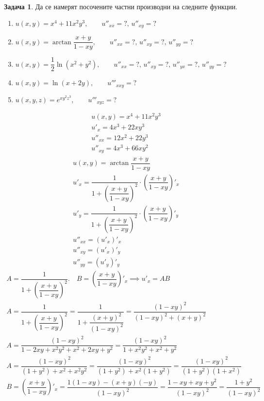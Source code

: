 \documentclass[a4paper,fleqn,12pt]{article}
\theoremstyle{definition}
\newtheorem{task}{Задача}[subsection]
\begin{document}
\begin{task}
Да се намерят посочените частни производни на следните функции.\\
\begin{enumerate}
\item $u(x,y) = x^4 + 11x^2y^3, \qquad u''_{xx} = ?,\, u''_{xy} = ?$ 
\item $u(x,y) = \arctan{\dfrac{x+y}{1-xy}}, \qquad u''_{xx} = ?,\, u''_{xy} = ?,\,u''_{yy} = ?$
\item $u(x,y) = \dfrac{1}{2} \ln{(x^2 + y^2)}, \qquad u''_{xx} = ?,\, u''_{xy} = ?,\,u''_{yx} = ?,\,u''_{yy} = ?$
\item $u(x,y) = \ln{(x + 2y)}, \qquad u'''_{xxy} = ?$
\item $u(x,y,z) = e^{xy^2z^3}, \qquad u'''_{xyz} = ?$
\end{enumerate}
\begin{gather*}
u(x,y) = x^4 + 11x^2y^3 \\
u'_x = 4x^3 + 22xy^3 \\
u''_{xx} = 12x^2 + 22y^3 \\
u''_{xy} = 4x^3 + 66xy^2 
\end{gather*}
\begin{gather*}
u(x,y) = \arctan{\dfrac{x+y}{1-xy}}\\
u'_x = \dfrac{1}{1 + \left( \dfrac{x+y}{1-xy} \right)^2} \cdot  \left( \dfrac{x+y}{1-xy} \right)'_x\\
u'_y = \dfrac{1}{1 + \left( \dfrac{x+y}{1-xy} \right)^2} \cdot  \left( \dfrac{x+y}{1-xy} \right)'_y\\
u''_{xx} = (u'_x)'_x\\
u''_{xy} = (u'_x)'_y\\
u''_{yy} = (u'_y)'_y
\end{gather*}
\begin{gather*}
A = \dfrac{1}{1 + \left( \dfrac{x+y}{1-xy} \right)^2}. \quad B = \left( \dfrac{x+y}{1-xy} \right)'_x \implies u'_x = AB\\
A = \dfrac{1}{1 + \left( \dfrac{x+y}{1-xy} \right)^2} =\dfrac{1}{1 + \dfrac{(x+y)^2}{(1-xy)^2}} = \dfrac{(1-xy)^2}{(1-xy)^2 + (x+y)^2}\\ 
A = \dfrac{(1-xy)^2}{1 - 2xy + x^2y^2 + x^2 + 2xy + y^2} = \dfrac{(1-xy)^2}{1 + x^2y^2 + x^2 + y^2}\\
A = \dfrac{(1-xy)^2}{(1 + y^2) + x^2 + x^2y^2} = \dfrac{(1-xy)^2}{(1 + y^2) + x^2(1 +y^2)} = \dfrac{(1-xy)^2}{(1 + y^2) (1 + x^2)}\\
B = \left( \dfrac{x+y}{1-xy} \right)'_x = \dfrac{1(1-xy) - (x+y)(-y)}{(1 - xy)^2} = \dfrac {1-xy + xy + y^2}{(1 - xy)^2} =\dfrac {1+y^2}{(1 - xy)^2}  \\

\end{gather*}
\end{task}
\end{document}

